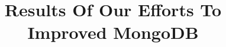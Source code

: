 \documentclass{../dependencies/acm_proc_article-sp}
\begin{document}
\title{ Results Of Our Efforts To Improved MongoDB }
%
%
%
%
%
\end{document}
